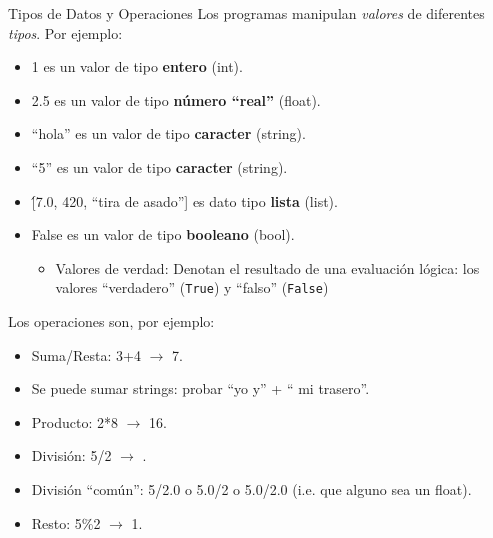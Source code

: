 \documentclass{beamer}
\begin{document}
\begin{frame}{Tipos de Datos y Operaciones}
Los programas manipulan \emph{valores} de diferentes \emph{tipos}. Por ejemplo:
\begin{itemize}
	\item 1 es un valor de tipo \textbf{entero} (int).\pause
	\item 2.5 es un valor de tipo \textbf{número ``real''} (float).\pause
	\item ``hola'' es un valor de tipo \textbf{caracter} (string).\pause
	\item ``5'' es un valor de tipo \textbf{caracter} (string).\pause
	\item \'[7.0, 420, “tira de asado”] es dato tipo \textbf{lista} (list).\pause	
	\item False es un valor de tipo \textbf{booleano} (bool).\pause


\begin{itemize}
\item Valores de verdad: Denotan el resultado de una evaluación lógica: los valores “verdadero” (\texttt{True}) y “falso” (\texttt{False})
\end{itemize}
\end{itemize}

Los operaciones son, por ejemplo:
\begin{itemize}
	\item Suma/Resta: 3+4 $\to$ 7.\pause
	\item Se puede sumar strings: probar ``yo y'' + `` mi trasero''.\pause
	\item Producto: 2*8 $\to$ 16.\pause
	\item División: 5/2 $\to$ . 
	\item División ``común'': 5/2.0 o 5.0/2 o 5.0/2.0 (i.e. que alguno sea un float).\pause
	\item Resto: 5\%2 $\to$ 1.
\end{itemize}
\end{frame}
\end{document}
